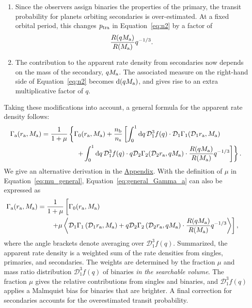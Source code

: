 \documentclass[12pt,modern]{aastex61}
\renewcommand{\a}{_{\rm a}}
\newcommand{\s}{_{\rm s}}
\renewcommand{\b}{_{\rm b}}
\begin{document}
\begin{enumerate}
\item Since the observers assign binaries the properties of the
primary, the transit probability for planets orbiting secondaries is
over-estimated. At a fixed orbital period, this changes
$p_{\rm tra}$ in Equation~\ref{eq:n2} by a factor of
\begin{equation}
  {R(qM\a) \over R(M\a)}q^{-1/3}.
\end{equation}

\item The contribution to the apparent rate density from
secondaries now depends on the mass of the secondary, $qM\a$. The
associated measure on the right-hand side of
Equation~\ref{eq:n2} becomes ${\rm d}(qM\a)$, and gives rise to an
extra multiplicative factor of $q$.


\end{enumerate}

Taking these modifications into account, a general formula for the
apparent rate density follows:
\begin{align}
    \notag
    \Gamma\a(r\a,M\a) &= \frac{1}{1+\mu}
    \left\{ \Gamma_0(r\a, M\a)+ 
    \frac{n\b}{n\s}
    \left[ \int_0^1 \mathrm{d}q \,
           \mathcal{D}_1^3 f(q)\cdot
           \mathcal{D}_1 \Gamma_1(\mathcal{D}_1r\a, M\a)\,
    \right.   
    \right. \\
    & \quad\quad\quad\quad\quad \left.\left.
    +\int_0^1 {\rm d}q\, 
         \mathcal{D}_1^3 f(q)\cdot q \mathcal{D}_2
         \Gamma_2(\mathcal{D}_2r\a, qM\a)\cdot
         \frac{R(qM\a)}{R(M\a)} q^{-1/3}
    \right] \right\}.
    \label{eq:general_Gamma_a}
\end{align}
We give an alternative derivation in the
\hyperref[sec:appendix]{Appendix}.
With the definition of $\mu$ in Equation~\ref{eq:mu_general},
Equation~\ref{eq:general_Gamma_a} can also be expressed as
\begin{align}
    \notag
    \notag
    \Gamma\a(r\a,M\a)
    &= 
    {1\over 1+\mu}
    \left[
       \Gamma_0(r\a, M\a) \phantom{\frac{1}{1}}
       \right.&\\
       &\quad\quad \left.+\mu
       \left\langle
       \mathcal{D}_1\Gamma_1\left(\mathcal{D}_1r\a, M\a\right)
       +
       {q \mathcal{D}_2}\Gamma_2\left(\mathcal{D}_2r\a,
       qM\a\right) \cdot {R(qM\a) \over R(M\a)}q^{-1/3}
       \right\rangle
    \right],
\end{align}
where the angle brackets denote averaging over $\mathcal{D}_1^3f(q)$.
Summarized, the apparent rate density is a weighted sum of the rate
densities from singles, primaries, and secondaries.  The weights are
determined by the fraction $\mu$ and mass ratio distribution
$\mathcal{D}_1^3f(q)$ of binaries {\it in the searchable volume}.  The
fraction $\mu$ gives the relative contributions from singles and
binaries, and $\mathcal{D}_1^3 f(q)$ applies a Malmquist bias for
binaries that are brighter.  A final correction for secondaries
accounts for the overestimated transit probability.
\end{document}

